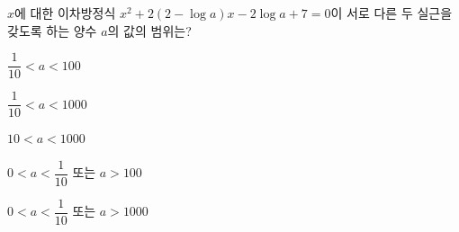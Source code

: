 $x$에 대한 이차방정식 $x^2+2(2-\log a)x-2\log a+7=0$이 서로 다른 두 실근을 갖도록 하는 양수 $a$의 값의 범위는?
\begin{choicesii}{\rule[-3ex]{0pt}{8ex}$\dfrac{1}{10}<a<100$}{\rule[-3ex]{0pt}{8ex}$\dfrac{1}{10}<a<1000$}{\rule[-3ex]{0pt}{8ex}$10<a<1000$}{\rule[-3ex]{0pt}{8ex}$0<a<\dfrac{1}{10}$ 또는 $a>100$}{\rule[-3ex]{0pt}{8ex}$0<a<\dfrac{1}{10}$ 또는 $a>1000$}\end{choicesii}
